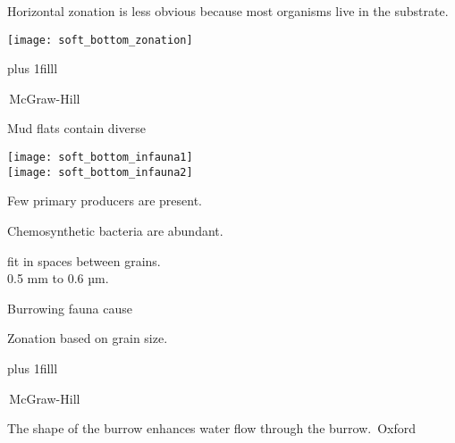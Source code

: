 \documentclass[t]{beamer}
\begin{document}
%
\begin{frame}[t]{Horizontal zonation is less obvious because most organisms live in the substrate.}

	\texttt{[image: soft\_bottom\_zonation]}
	
	\vskip0pt plus 1filll

	\tiny\textcopyright\,McGraw-Hill

\end{frame}
%
\begin{frame}[t]{Mud flats contain diverse }

\vspace*{-\baselineskip}

\begin{multicols}{2}

	\begin{center}
		\texttt{[image: soft\_bottom\_infauna1]}\\
		\texttt{[image: soft\_bottom\_infauna2]}\\
	\end{center}

\columnbreak

	\hangpara Few primary producers are present.
	
	\hangpara Chemosynthetic bacteria are abundant.
	
	\hangpara {} fit in spaces between grains.\\
		\hspace*{1em} 0.5 mm to 0.6 µm.
		
	\hangpara Burrowing fauna cause 
	
	\hangpara Zonation based on grain size.

\end{multicols}

	\vspace*{-0.5\baselineskip}
	
	\vskip0pt plus 1filll

	\tiny\textcopyright\,McGraw-Hill

\end{frame}
%
{
\begin{frame}[b]{The shape of the burrow enhances water flow through the burrow.}
\tiny\textcopyright\,Oxford
\end{frame}
}
%
\end{document}
